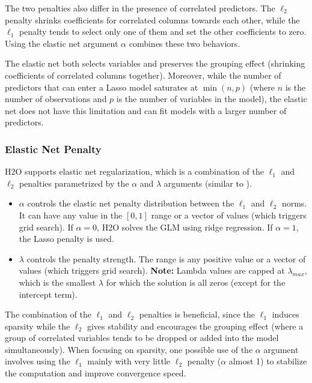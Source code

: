 The two penalties also differ in the presence of correlated
predictors. The $\ell_2$ penalty shrinks coefficients for correlated columns towards each other, while the $\ell_1$ penalty
tends to select only one of them and set the other coefficients to zero. Using the elastic net argument $\alpha$ combines these two behaviors. 

The elastic net both selects variables and preserves the grouping effect (shrinking coefficients of correlated columns together). Moreover, while the number of predictors that can enter a Lasso model saturates at $\min(n,p)$ (where $n$ is the number of observations and $p$ is the number of variables in the model), the elastic net does not have this limitation and can fit models with a larger number of predictors. %

\subsubsection{Elastic Net Penalty}

H2O supports elastic net regularization, which is a combination of the $\ell_1$ and $\ell_2$ penalties parametrized by the $\alpha$ and $\lambda$ arguments (similar to ).
\begin{itemize}
\item $\alpha$ controls the elastic net penalty distribution between the $\ell_1$ and $\ell_2$ norms. It can have any value
in the $[0,1]$ range or a vector of values (which triggers grid search). If $\alpha = 0$, H2O solves the GLM using ridge regression. If $\alpha = 1$, the Lasso penalty is used. \nowidow[3]
\item $\lambda$ controls the penalty strength. The range is any positive value or a vector of values (which triggers grid search). 
\textbf{Note:} Lambda values are capped at $\lambda_{max}$, which is the smallest $\lambda$ for which the solution is
all zeros (except for the intercept term). %
\end{itemize}

The combination of the $\ell_1$ and $\ell_2$ penalties is beneficial, since the $\ell_1$ induces sparsity while the $\ell_2$ gives
stability and encourages the grouping effect (where a group of correlated variables tends to be dropped or added
into the model simultaneously). When focusing on sparsity, one possible use of the $\alpha$ argument  involves using the $\ell_1$ mainly with very little $\ell_2$ penalty
($\alpha$ almost 1) to stabilize the computation and improve convergence speed.

